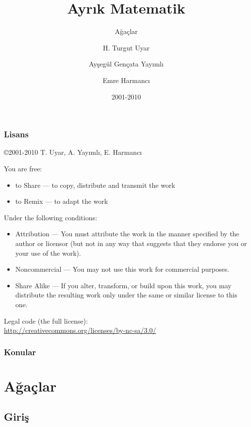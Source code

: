 \documentclass[dvipsnames]{beamer}
\title{Ayrık Matematik}
\subtitle{Ağaçlar}
\author{H. Turgut Uyar \and Ayşegül Gençata Yayımlı \and Emre Harmancı}
\date{2001-2010}
\theoremstyle{definition}
\theoremstyle{example}
\theoremstyle{plain}
\begin{document}
\begin{frame}
  \titlepage
\end{frame}

\begin{frame}
  \frametitle{Lisans}

  \hfill
  \copyright 2001-2010 T. Uyar, A. Yayımlı, E. Harmancı

  \vfill
  \begin{tiny}
    You are free:
    \begin{itemize}
      \item to Share — to copy, distribute and transmit the work
      \item to Remix — to adapt the work
    \end{itemize}

    Under the following conditions:
    \begin{itemize}
      \item Attribution — You must attribute the work in the manner specified by
        the author or licensor (but not in any way that suggests that they
        endorse you or your use of the work).

      \item Noncommercial — You may not use this work for commercial purposes.

      \item Share Alike — If you alter, transform, or build upon this work, you
        may distribute the resulting work only under the same or similar license
        to this one.
    \end{itemize}
  \end{tiny}

  \vfill
  Legal code (the full license):\\
  \url{http://creativecommons.org/licenses/by-nc-sa/3.0/}
\end{frame}

\begin{frame}
  \frametitle{Konular}
  \tableofcontents
\end{frame}

\section{Ağaçlar}

\subsection{Giriş}
\end{document}

